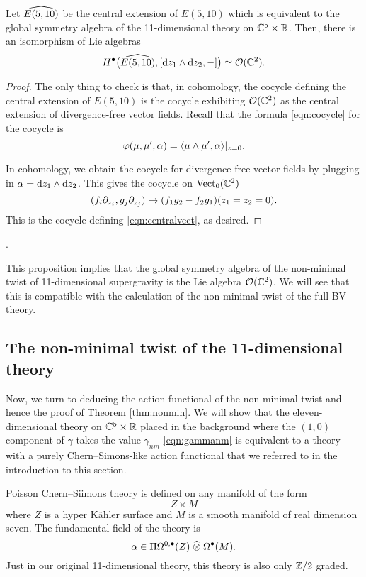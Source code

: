 \begin{prop}
\label{prop:ham}
Let $\Hat{E(5,10)}$ be the central extension of $E(5,10)$ which is equivalent to the global symmetry algebra of the 11-dimensional theory on $\CC^5 \times \RR$. 
Then, there is an isomorphism of Lie algebras 
\[
H^\bu \big(\Hat{E(5,10)} , [\d z_1 \wedge \d z_2, -] \big) \simeq \cO(\CC^2) .
\]
\end{prop}
\begin{proof}
The only thing to check is that, in cohomology, the cocycle defining the central extension of $E(5,10)$ is the cocycle exhibiting $\cO(\CC^2)$ as the central extension of divergence-free vector fields. 
Recall that the formula \eqref{eqn:cocycle} for the cocycle is 
\[
\varphi(\mu, \mu', \alpha) = \<\mu \wedge \mu', \alpha\>|_{z=0}.
\]

In cohomology, we obtain the cocycle for divergence-free vector fields by plugging in $\alpha = \d z_1 \wedge \d z_2$. 
This gives the cocycle on $\Vect_0(\CC^2)$ 
\[
(f_i \del_{z_i}, g_j \del_{z_j}) \mapsto (f_1 g_2 - f_2 g_1)(z_1=z_2=0) .
\]
This is the cocycle defining \eqref{eqn:centralvect}, as desired. 
\end{proof}.

This proposition implies that the global symmetry algebra of the non-minimal twist of 11-dimensional supergravity is the Lie algebra $\cO(\CC^2)$. 
We will see that this is compatible with the calculation of the non-minimal twist of the full BV theory. 

\subsection{The non-minimal twist of the 11-dimensional theory}

Now, we turn to deducing the action functional of the non-minimal twist and hence the proof of Theorem \ref{thm:nonmin}. 
We will show that the eleven-dimensional theory on $\CC^5 \times \RR$ placed in the background where the $(1,0)$ component of $\gamma$ takes the value $\gamma_{nm}$ \eqref{eqn:gammanm} is equivalent to a theory with a purely Chern--Simons-like action functional that we referred to in the introduction to this section. 

Poisson Chern--Siimons theory is defined on any manifold of the form
\[
Z \times M
\]
where $Z$ is a hyper K\"ahler surface and $M$ is a smooth manifold of real dimension seven. 
The fundamental field of the theory is  
\[
\alpha \in \Pi \Omega^{0,\bu}(Z) \; \Hat{\otimes} \; \Omega^\bu(M)  .
\]
Just in our original 11-dimensional theory, this theory is also only $\ZZ/2$ graded. 

